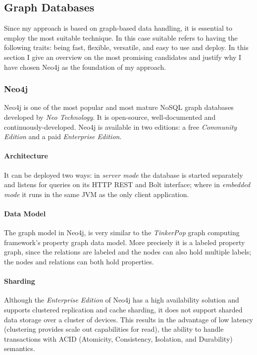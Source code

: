 
\subsection{Graph Databases}
\label{sect:graph-databases}
Since my approach is based on graph-based data handling, it is essential to employ the most suitable technique. In this case suitable refers to having the following traits: being fast, flexible, versatile, and easy to use and deploy. In this section I give an overview on the most promising candidates and justify why I have chosen Neo4j as the foundation of my approach.

\subsubsection{Neo4j}
\label{sect:neo4j}
Neo4j is one of the most popular and most mature NoSQL graph databases developed by \emph{Neo Technology}. It is open-source, well-documented and continuously-developed. Neo4j is available in two editions: a free \emph{Community Edition} and a paid \emph{Enterprise Edition}.~\cite{neo4j}

\paragraph{Architecture}
It can be deployed two ways: in \emph{server mode} the database is started separately and listens for queries on its HTTP REST and Bolt interface; where in \emph{embedded mode} it runs in the same JVM as the only client application.

\paragraph{Data Model}
The graph model in Neo4j,  is very similar to the \emph{TinkerPop} graph computing framework's property graph data model. More precisely it is a labeled property graph, since the relations are labeled and the nodes can also hold multiple labels; the nodes and relations can both hold properties.

\paragraph{Sharding}
Although the \emph{Enterprise Edition} of Neo4j has a high availability solution and supports clustered replication and cache sharding, it does not support sharded data storage over a cluster of devices. This results in the advantage of low latency (clustering provides scale out capabilities for read), the ability to handle transactions with ACID (Atomicity, Consistency, Isolation, and Durability) semantics.~\cite{neo4j-product}

